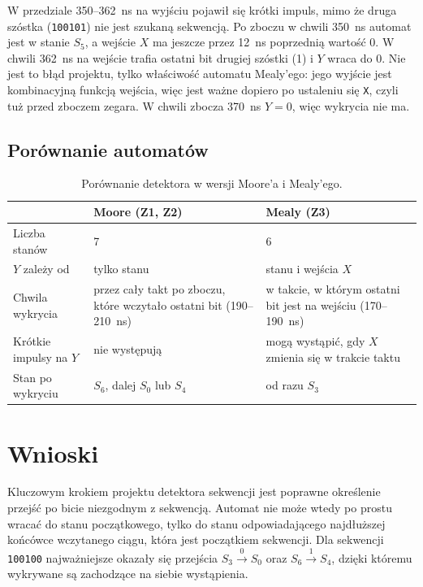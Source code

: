 \documentclass[11pt,a4paper]{article}
\begin{document}
W przedziale 350--362~ns na wyjściu pojawił się krótki impuls, mimo że druga szóstka (\texttt{100101}) nie jest szukaną sekwencją. Po zboczu w chwili 350~ns automat jest w stanie $S_5$, a wejście $X$ ma jeszcze przez 12~ns poprzednią wartość 0. W chwili 362~ns na wejście trafia ostatni bit drugiej szóstki (1) i $Y$ wraca do 0. Nie jest to błąd projektu, tylko właściwość automatu Mealy'ego: jego wyjście jest kombinacyjną funkcją wejścia, więc jest ważne dopiero po ustaleniu się \texttt{X}, czyli tuż przed zboczem zegara. W chwili zbocza 370~ns $Y = 0$, więc wykrycia nie ma.

\subsection{Porównanie automatów}

\begin{table}[H]
\centering
\small
\begin{tabular}{p{3.4cm}p{5.4cm}p{5.4cm}}
\toprule
 & Moore (Z1, Z2) & Mealy (Z3)\\
\midrule
Liczba stanów & 7 & 6\\
$Y$ zależy od & tylko stanu & stanu i wejścia $X$\\
Chwila wykrycia & przez cały takt po zboczu, które wczytało ostatni bit (190--210~ns) & w takcie, w którym ostatni bit jest na wejściu (170--190~ns)\\
Krótkie impulsy na $Y$ & nie występują & mogą wystąpić, gdy $X$ zmienia się w trakcie taktu\\
Stan po wykryciu & $S_6$, dalej $S_0$ lub $S_4$ & od razu $S_3$\\
\bottomrule
\end{tabular}
\caption{Porównanie detektora w wersji Moore'a i Mealy'ego.}
\end{table}

\section{Wnioski}

Kluczowym krokiem projektu detektora sekwencji jest poprawne określenie przejść po bicie niezgodnym z sekwencją. Automat nie może wtedy po prostu wracać do stanu początkowego, tylko do stanu odpowiadającego najdłuższej końcówce wczytanego ciągu, która jest początkiem sekwencji. Dla sekwencji \texttt{100100} najważniejsze okazały się przejścia $S_3 \xrightarrow{0} S_0$ oraz $S_6 \xrightarrow{1} S_4$, dzięki któremu wykrywane są zachodzące na siebie wystąpienia.
\end{document}
